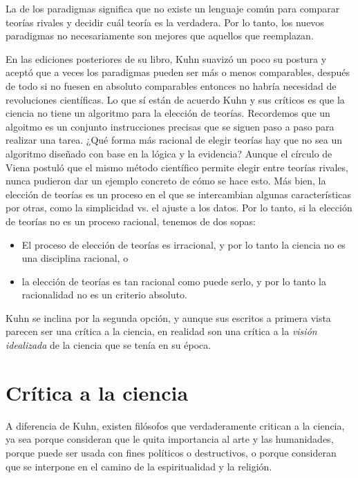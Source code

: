\begin{remember}
    \label{rem:inconmensurabilidad}
    La  de los paradigmas significa que no
    existe un lenguaje común para comparar teorías rivales y decidir cuál teoría
    es la verdadera.
    Por lo tanto, los nuevos paradigmas no necesariamente son mejores que
    aquellos que reemplazan.
\end{remember}

En las ediciones posteriores de su libro, Kuhn suavizó un poco su postura y
aceptó que a veces los paradigmas pueden ser más o menos comparables, después de
todo si no fuesen en absoluto comparables entonces no habría necesidad de
revoluciones científicas.
Lo que sí están de acuerdo Kuhn y sus críticos es que la ciencia no tiene un
algoritmo para la elección de teorías.
Recordemos que un algoitmo es un conjunto instrucciones precisas que se siguen
paso a paso para realizar una tarea.
¿Qué forma más racional de elegir teorías hay que no sea un algoritmo diseñado
con base en la lógica y la evidencia?
Aunque el círculo de Viena postuló que el mismo método científico permite
elegir entre teorías rivales, nunca pudieron dar un ejemplo concreto de cómo se
hace esto.
Más bien, la elección de teorías es un proceso en el que se intercambian algunas
características por otras, como la simplicidad vs. el ajuste a los datos.
Por lo tanto, si la elección de teorías no es un proceso racional, tenemos de
dos sopas:
\begin{itemize}
    \item El proceso de elección de teorías es irracional, y por lo tanto la
          ciencia no es una disciplina racional, o
    \item la elección de teorías es tan racional como puede serlo, y por lo
          tanto la racionalidad no es un criterio absoluto.
\end{itemize}
Kuhn se inclina por la segunda opción, y aunque sus escritos a primera vista
parecen ser una crítica a la ciencia, en realidad son una crítica a la
\emph{visión idealizada} de la ciencia que se tenía en su época.


\section{Crítica a la ciencia}
\label{sec:criticaalaciencia}
A diferencia de Kuhn, existen filósofos que verdaderamente critican a la
ciencia, ya sea porque consideran que le quita importancia al arte y las
humanidades, porque puede ser usada con fines políticos o destructivos, o porque
consideran que se interpone en el camino de la espiritualidad y la religión.

